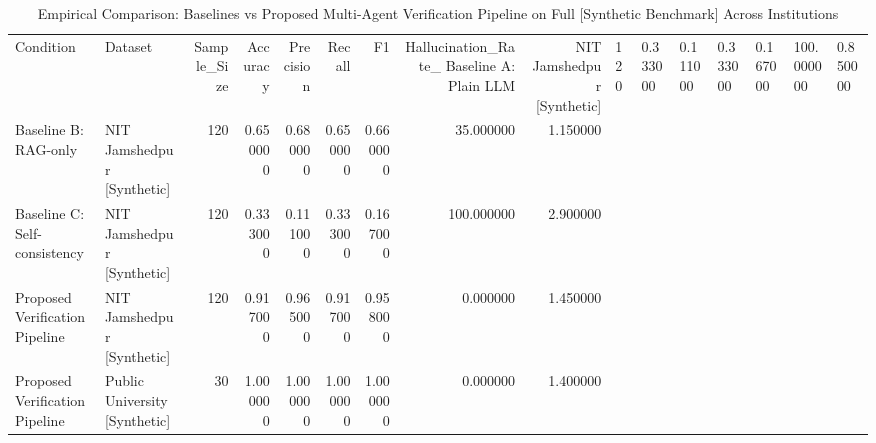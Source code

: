 \begin{table}
\caption{Empirical Comparison: Baselines vs Proposed Multi-Agent Verification Pipeline on Full [Synthetic Benchmark] Across Institutions}
\label{tab:verification_results_synthetic}
\begin{tabular}{llrrrrrrr}
\toprule
Condition & Dataset & Sample_Size & Accuracy & Precision & Recall & F1 & Hallucination_Rate_%
\midrule
Baseline A: Plain LLM & NIT Jamshedpur [Synthetic] & 120 & 0.333000 & 0.111000 & 0.333000 & 0.167000 & 100.000000 & 0.850000 \\
Baseline B: RAG-only & NIT Jamshedpur [Synthetic] & 120 & 0.650000 & 0.680000 & 0.650000 & 0.660000 & 35.000000 & 1.150000 \\
Baseline C: Self-consistency & NIT Jamshedpur [Synthetic] & 120 & 0.333000 & 0.111000 & 0.333000 & 0.167000 & 100.000000 & 2.900000 \\
Proposed Verification Pipeline & NIT Jamshedpur [Synthetic] & 120 & 0.917000 & 0.965000 & 0.917000 & 0.958000 & 0.000000 & 1.450000 \\
Proposed Verification Pipeline & Public University [Synthetic] & 30 & 1.000000 & 1.000000 & 1.000000 & 1.000000 & 0.000000 & 1.400000 \\
\bottomrule
\end{tabular}
\end{table}
